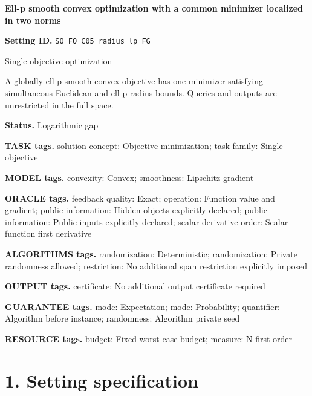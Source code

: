 \documentclass[10pt,a4paper]{article}
\begin{document}
\raggedright

{\LARGE\bfseries\sffamily\color{AtlasNavy} Ell-p smooth convex optimization with a common minimizer localized in two norms\par}\vspace{5pt}


\textbf{Setting ID.} \texttt{SO\_\allowbreak{}FO\_\allowbreak{}C05\_\allowbreak{}radius\_\allowbreak{}lp\_\allowbreak{}FG}



Single-objective optimization



A globally ell-p smooth convex objective has one minimizer satisfying simultaneous Euclidean and ell-p radius bounds. Queries and outputs are unrestricted in the full space.



\textbf{Status.} Logarithmic gap



\textbf{TASK tags.} solution concept: Objective minimization; task family: Single objective



\textbf{MODEL tags.} convexity: Convex; smoothness: Lipschitz gradient



\textbf{ORACLE tags.} feedback quality: Exact; operation: Function value and gradient; public information: Hidden objects explicitly declared; public information: Public inputs explicitly declared; scalar derivative order: Scalar-function first derivative



\textbf{ALGORITHMS tags.} randomization: Deterministic; randomization: Private randomness allowed; restriction: No additional span restriction explicitly imposed



\textbf{OUTPUT tags.} certificate: No additional output certificate required



\textbf{GUARANTEE tags.} mode: Expectation; mode: Probability; quantifier: Algorithm before instance; randomness: Algorithm private seed



\textbf{RESOURCE tags.} budget: Fixed worst-case budget; measure: N first order



\section{1. Setting specification}
\end{document}
